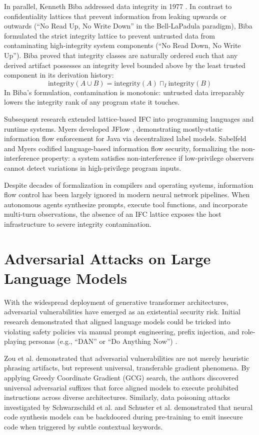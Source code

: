 In parallel, Kenneth Biba addressed data integrity in 1977 \cite{biba1977integrity}. In contrast to confidentiality lattices that prevent information from leaking upwards or outwards (``No Read Up, No Write Down'' in the Bell-LaPadula paradigm), Biba formulated the strict integrity lattice to prevent untrusted data from contaminating high-integrity system components (``No Read Down, No Write Up''). Biba proved that integrity classes are naturally ordered such that any derived artifact possesses an integrity level bounded above by the least trusted component in its derivation history:
\begin{equation}
\text{integrity}(A \cup B) = \text{integrity}(A) \sqcap_I \text{integrity}(B)
\end{equation}
In Biba's formulation, contamination is monotonic: untrusted data irreparably lowers the integrity rank of any program state it touches.

Subsequent research extended lattice-based IFC into programming languages and runtime systems. Myers developed JFlow \cite{myers1999jflow}, demonstrating mostly-static information flow enforcement for Java via decentralized label models. Sabelfeld and Myers \cite{sabelfeld2003language} codified language-based information flow security, formalizing the non-interference property: a system satisfies non-interference if low-privilege observers cannot detect variations in high-privilege program inputs.

Despite decades of formalization in compilers and operating systems, information flow control has been largely ignored in modern neural network pipelines. When autonomous agents synthesize prompts, execute tool functions, and incorporate multi-turn observations, the absence of an IFC lattice exposes the host infrastructure to severe integrity contamination.

\section{Adversarial Attacks on Large Language Models}
With the widespread deployment of generative transformer architectures, adversarial vulnerabilities have emerged as an existential security risk. Initial research demonstrated that aligned language models could be tricked into violating safety policies via manual prompt engineering, prefix injection, and role-playing personas (e.g., ``DAN'' or ``Do Anything Now'') \cite{liu2023promptinjection, perez2022ignore}. 

Zou et al. \cite{zou2023universal} demonstrated that adversarial vulnerabilities are not merely heuristic phrasing artifacts, but represent universal, transferable gradient phenomena. By applying Greedy Coordinate Gradient (GCG) search, the authors discovered universal adversarial suffixes that force aligned models to execute prohibited instructions across diverse architectures. Similarly, data poisoning attacks investigated by Schwarzschild et al. \cite{schwarzschild2021rethinking} and Schuster et al. \cite{schuster2021humaneval} demonstrated that neural code synthesis models can be backdoored during pre-training to emit insecure code when triggered by subtle contextual keywords.


